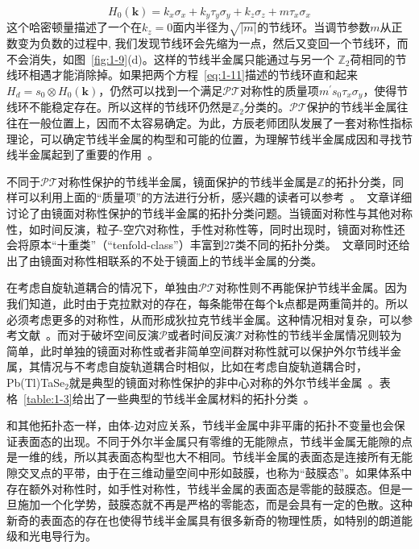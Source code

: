 \begin{equation}
    \label{eq:1-11}
    H_{0}(\mathbf{k})=k_{x} \sigma_{x}+k_{y} \tau_{y} \sigma_{y}+k_{z} \sigma_{z}+m \tau_{x} \sigma_{x}
\end{equation}
这个哈密顿量描述了一个在$k_z=0$面内半径为$\sqrt{|m|}$的节线环。当调节参数$m$从正数变为负数的过程中, 我们发现节线环会先缩为一点，然后又变回一个节线环，而不会消失，如图~\ref{fig:1-9}(d)。这样的节线半金属只能通过与另一个
$\mathbb{Z}_2$荷相同的节线环相遇才能消除掉。如果把两个方程~\ref{eq:1-11}描述的节线环直和起来$H_{d}=s_{0} \otimes H_{0}(\mathbf{k})$，仍然可以找到一个满足$\mathcal{PT}$对称性的质量项$m^{\prime} s_{0} \tau_{x} \sigma_{y}$，使得节线环不能稳定存在。所以这样的节线环仍然是$\mathbb{Z}_2$分类的。$\mathcal{PT}$保护的节线半金属往往在一般位置上，因而不太容易确定。为此，方辰老师团队发展了一套对称性指标理论，可以确定节线半金属的构型和可能的位置，为理解节线半金属成因和寻找节线半金属起到了重要的作用~\citep{song2018nl}。

不同于$\mathcal{PT}$对称性保护的节线半金属，镜面保护的节线半金属是$\mathbb{Z}$的拓扑分类，同样可以利用上面的“质量项”的方法进行分析，感兴趣的读者可以参考~\citep{chiu2014}。~\cite{chiu2014}文章详细讨论了由镜面对称性保护的节线半金属的拓扑分类问题。当镜面对称性与其他对称性，如时间反演，粒子-空穴对称性，手性对称性等，同时出现时，镜面对称性还会将原本“十重类”（“tenfold-class”）丰富到27类不同的拓扑分类。~\cite{chiu2014}文章同时还给出了由镜面对称性相联系的不处于镜面上的节线半金属的分类。

在考虑自旋轨道耦合的情况下，单独由$\mathcal{PT}$对称性则不再能保护节线半金属。因为我们知道，此时由于克拉默对的存在，每条能带在每个$\mathbf{k}$点都是两重简并的。所以必须考虑更多的对称性，从而形成狄拉克节线半金属。这种情况相对复杂，可以参考文献~\cite{fang2015nl,liang2016,chen2016,shao2020,wu2020}。而对于破坏空间反演$\mathcal{P}$或者时间反演$\mathcal{T}$对称性的节线半金属情况则较为简单，此时单独的镜面对称性或者非简单空间群对称性就可以保护外尔节线半金属，其情况与不考虑自旋轨道耦合时相似，比如在考虑自旋轨道耦合时，Pb(Tl)TaSe$_2$就是典型的镜面对称性保护的非中心对称的外尔节线半金属~\citep{TlTaSe,Bian2016}。表格~\ref{table:1-3}给出了一些典型的节线半金属材料的拓扑分类~\citep{Fang2016cpb}。

和其他拓扑态一样，由体-边对应关系，节线半金属中非平庸的拓扑不变量也会保证表面态的出现。不同于外尔半金属只有零维的无能隙点，节线半金属无能隙的点是一维的线，所以其表面态构型也大不相同。节线半金属的表面态是连接所有无能隙交叉点的平带，由于在三维动量空间中形如鼓膜，也称为“鼓膜态”。如果体系中存在额外对称性时，如手性对称性，节线半金属的表面态是零能的鼓膜态。但是一旦施加一个化学势，鼓膜态就不再是严格的零能态，而是会具有一定的色散。这种新奇的表面态的存在也使得节线半金属具有很多新奇的物理性质，如特别的朗道能级和光电导行为\citep{landau,2016Optical}。

